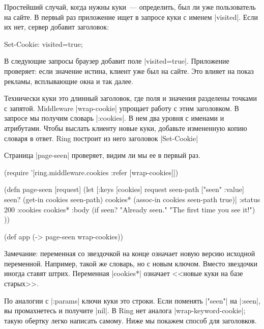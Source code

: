 Простейший случай, когда нужны куки~--- определить, был ли уже пользователь на
сайте. В первый раз приложение ищет в запросе куки с именем
\spverb|visited|. Если их нет, сервер добавит заголовок:

\begin{english}
  \begin{http}
Set-Cookie: visited=true;
  \end{http}
\end{english}

В следующие запросы браузер добавит поле \spverb|visited=true|. Приложение
проверяет: если значение истина, клиент уже был на сайте.  Это влияет на
показ рекламы, всплывающие окна и так далее.

Технически куки это длинный заголовок, где поля и значения разделены точками с
запятой. Middleware \spverb|wrap-cookie| упрощает работу с этим заголовком. В
запросе мы получим словарь \spverb|:cookies|. В нем два уровня с именами и
атрибутами. Чтобы выслать клиенту новые куки, добавьте измененную копию словаря
в ответ. Ring построит из него заголовок \spverb|Set-Cookie|

Страница \spverb|page-seen| проверяет, видим ли мы ее в первый раз.

\begin{english}
  \begin{clojure}
(require '[ring.middleware.cookies
           :refer [wrap-cookies]])

(defn page-seen [request]
  (let [{:keys [cookies]} request
        seen-path ["seen" :value]
        seen? (get-in cookies seen-path)
        cookies* (assoc-in cookies seen-path true)]
    {:status 200
     :cookies cookies*
     :body (if seen?
             "Already seen."
             "The first time you see it!") }))

(def app (-> page-seen
             wrap-cookies))
  \end{clojure}
\end{english}

Замечание: переменная со звездочкой на конце означает новую версию исходной
переменной. Например, такой же словарь, но с новым ключом. Вместо звездочки
иногда ставят штрих. Переменная \spverb|cookies*| означает <<новые куки на базе
старых>>.

По аналогии с \spverb|:params| ключи куки это строки. Если поменять
\spverb|"seen"| на \spverb|:seen|, вы промахнетесь и получите \spverb|nil|. В
Ring нет аналога \spverb|wrap-keyword-cookie|; такую обертку легко написать
самому. Ниже мы покажем способ для заголовков.

